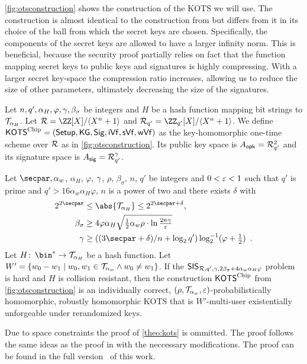 \autoref{fig:otsconstruction} shows the construction of the KOTS we will use.
The construction is almost identical to the construction from \cite{CCS:FleSimZha22} but differs from it in its choice of the ball from which the secret keys are chosen.
Specifically, the components of the secret keys are allowed to have a larger infinity norm.
This is beneficial, because the security proof partially relies on fact that the function mapping secret keys to public keys and signatures is highly compressing.
With a larger secret key-space the compression ratio increases, allowing us to reduce the size of other parameters, ultimately decreasing the size of the signatures.

\begin{definition}\label{def:our_ots}
Let $n, q', \alpha_H, \varphi, \gamma, \beta_\sigma$ be integers and $H$ be a hash function mapping bit strings to $\mathcal{T}_{\alpha_H}$.
Let $\ring = \defring$ and $\ring_{q'} = \defringqq$.
% 
We define $\mathsf{KOTS}^{\textup{Chip}} = (\mathsf{Setup}, \mathsf{KG}, \mathsf{Sig},\allowbreak \mathsf{iVf}, \mathsf{sVf}, \mathsf{wVf})$ as the key-homomorphic one-time scheme over $\mathcal{R}$ as in \autoref{fig:otsconstruction}.
Its public key space is $A_{\mathsf{opk}} = \mathcal{R}_{q'}^{2}$ and its signature space is $A_{\mathsf{sig}} = \mathcal{R}_{q'}^\gamma$.
\end{definition}


\begin{theorem}\label{theo:kots}
Let $\secpar, \alpha_w$, $\alpha_H$, $\varphi$, $\gamma$, $\rho$, $\beta_\sigma$, $n$, $q'$ be integers and $0 < \varepsilon < 1$ such that $q'$ is prime and $q' > 16\alpha_w\alpha_H\varphi$, $n$ is a power of two and there exists $\delta$ with
\begin{align*}
2^{2\secpar} & \leq \abs{\tern_{\alpha_H}} \leq 2^{2\secpar+\delta},\\
\beta_\sigma & \geq 4\varphi\alpha_H\sqrt{\tfrac{1}{2}\alpha_w\rho \cdot \ln\tfrac{2n\otspkkeylen}{\errorbound} }\\
\otspkkeylen & \geq((3\secpar+\delta)/n+\log_2q')\log^{-1}_2(\varphi+\tfrac{1}{2})\enspace.
\end{align*}
Let $H\colon\, \bin^* \to \tern_{\alpha_H}$ be a hash function.
Let $W' = \{w_0-w_1\mid w_0,w_1\in\mathcal{T}_{\alpha_w} \land w_0\neq w_1\}$.
If the $\mathsf{SIS}_{\mathcal{R},q',\gamma,2\beta_\sigma+4\alpha_w\alpha_H\varphi}$ problem is hard and $H$ is collision resistant,
then the construction $\mathsf{KOTS}^{\textup{Chip}}$ from \autoref{fig:otsconstruction} is an individually correct, $(\rho,\mathcal{T}_{\alpha_w},\varepsilon)$-probabilistically homomorphic, robustly homomorphic KOTS that is $W'$-multi-user existentially unforgeable under rerandomized keys.
\end{theorem}
Due to space constraints the proof of \autoref{theo:kots} is ommitted.
The proof follows the same ideas as the proof in \cite{CCS:FleSimZha22} with the neccessary modifications.
The proof can be found in the full version~\cite{fullversion} of this work.

